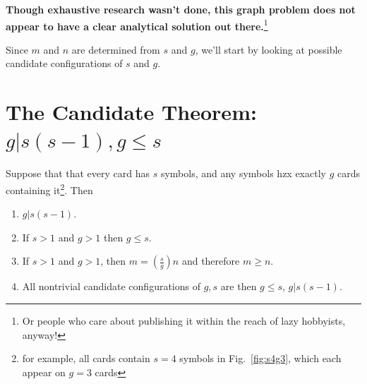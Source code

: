 \documentclass[11pt, oneside]{article} 	%
\begin{document}
\textbf{Though exhaustive research wasn't done, this graph problem does not appear to have a clear analytical solution out there.}\footnote{Or people who care about publishing it within the reach of lazy hobbyists, anyway!}

Since $m$ and $n$ are determined from $s$ and $g$, we'll start by looking at possible candidate configurations of $s$ and $g$.

\section{The Candidate Theorem: $g | s(s-1), g \leq s$}

Suppose that that every card has $s$ symbols, and any symbols hzx exactly $g$ cards containing it\footnote{for example, all cards contain $s=4$ symbols in Fig.~\ref{fig:s4g3}, which each appear on $g=3$ cards}. Then 

\begin{framed}
\begin{enumerate}
\item $g | s(s-1)$.
\item If $s >1 $ and $g > 1$ then $g \leq s$.
\item If $s >1 $ and $g > 1$, then $m = (\frac{s}{g})n$ and therefore $m \geq n$.
\item All nontrivial candidate configurations of $g, s$ are then $g \leq s$, $g | s(s-1)$.
\end{enumerate}
\end{framed}
\end{document}
